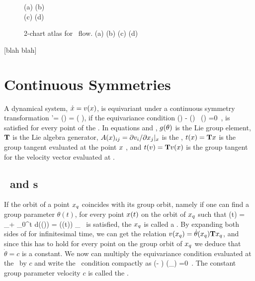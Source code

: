 \documentclass[aip,cha,
reprint,
secnumarabic,
nofootinbib, tightenlines,
nobibnotes, showkeys, showpacs,
groupedaddress,
]{revtex4-1}
\begin{document}
\begin{figure}
 \begin{center}
 \setlength{\unitlength}{0.20\textwidth}
(a)
(b)
\\
(c)
(d)
 \end{center}
    \caption{
2-chart atlas for \twoMode\ flow.
(a)
(b)
(c)
(d)
    }
\label{fig:2modeSects}
\end{figure}

 [blah blah]

\section{Continuous Symmetries}
\label{s:symm}

A dynamical system, $\dot{x}=v(x)$, is equivariant under a continuous
symmetry transformation
\beq
	\ssp'= \LieEl (\theta) \ssp = \exp\left( \theta \Lg\right)\ssp,
if the equivariance condition 
\beq
  \groupTan(\vel)  - \Mvar(\ssp) \, \groupTan(\ssp) =0
  \,,
is satisfied for every point of the \statesp . In equations  and ,
$g (\theta)$ is the Lie group element, $\mathbf{T}$ is the Lie algebra generator,
$A(x)_{ij} = {\partial v_i}/{\partial x_j} |_x$  is the \stabmat ,
$ t(x) = \mathbf{T} x $ is the group tangent evaluated at the point $x$ ,
and $ t(v) = \mathbf{T} v(x) $ is the group tangent for the velocity
vector evaluated at \ssp .

\subsection{\Reqva\ and \rpo s}
\label{s:relatives}

If the orbit of a point $x_q$ coincides with its group orbit,
namely if one can find a group parameter $\theta (t)$, for every point $x (t)$
on the orbit of $x_q$ such that
\beq
  \ssp (t) = \ssp_\stagn + \int_0^t d\tau \vel(\ssp (\tau)) = \LieEl (\theta (t)) \ssp_\stagn
  \,
is satisfied, the $x_q$ is called a \reqv . By expanding both sides of 
for infinitesimal time, we can get the relation $v(x_q) = \dot{\theta}(x_q) \mathbf{T} x_q$,
and since this has to hold for every point on the group orbit of $x_q$
we deduce that $\dot{\theta} = c$ is a constant. We now can multiply the equivariance
condition  evaluated at the \reqv\ by $c$ and write the
\reqv\ condition compactly as
\beq
(\velRel \Lg - \Mvar ) \vel (\ssp_\stagn) =0
\,.
The constant group parameter velocity $c$  is called the \phaseVel .
\end{document}
